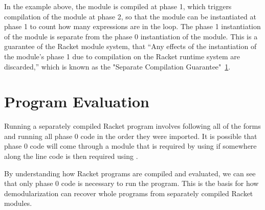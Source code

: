 In the example above, the  module is compiled at phase 1, which triggers compilation of the  module at phase 2, so that the  module can be instantiated at phase 1 to count how many expressions are in the  loop.
The phase 1 instantiation of the  module is separate from the phase 0 instantiation of the module.
This is a guarantee of the Racket module system, that ``Any effects of the instantiation of the module's phase 1 due to compilation on the Racket runtime system are discarded,'' which is known as the "Separate Compilation Guarantee"~\ref{}.

\section{Program Evaluation}
Running a separately compiled Racket program involves following all of the  forms and running all phase 0 code in the order they were imported.
It is possible that phase 0 code will come through a module that is required by using  if somewhere along the line code is then required using .

By understanding how Racket programs are compiled and evaluated, we can see that only phase 0 code is necessary to run the program. 
This is the basis for how demodularization can recover whole programs from separately compiled Racket modules. 
